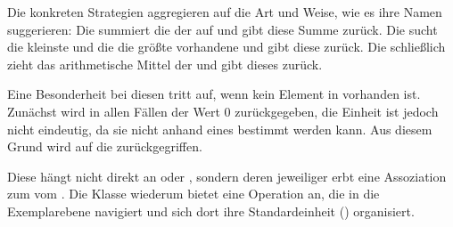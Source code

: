 Die konkreten Strategien aggregieren auf die Art und Weise, wie es ihre Namen suggerieren: Die
 summiert die  der  auf und gibt diese Summe zurück. Die
 sucht die kleinste und die  die größte vorhandene
 und gibt diese zurück. Die  schließlich zieht das arithmetische Mittel der
 und gibt dieses zurück.

Eine Besonderheit bei diesen  tritt auf, wenn kein Element in  vorhanden ist.
Zunächst wird in allen Fällen der Wert 0 zurückgegeben, die Einheit ist jedoch nicht eindeutig, da sie nicht anhand
eines  bestimmt werden kann. Aus diesem Grund wird auf die  zurückgegriffen.

Diese hängt nicht direkt an  oder , sondern deren jeweiliger  erbt eine
Assoziation zum  vom . Die Klasse  wiederum
bietet eine Operation  an, die in die Exemplarebene navigiert und sich dort ihre Standardeinheit
() organisiert.